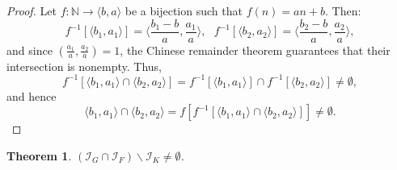 \documentclass{amsart}
\newtheorem{thm}{Theorem}[section]
\theoremstyle{definition}
\newcommand{\N}{{\mathbb N}}
\newcommand{\I}{\mathcal I}
\newcommand{\arithseq}[2]{\langle#2, #1\rangle}
\newcommand{\Arithseq}[2]{\Big\langle#2, #1\Big\rangle}
\begin{document}
\begin{proof}
Let $f\colon\N\to \arithseq{a}{b}$ be a bijection such that $f(n) = an+b$. Then: 
$$f^{-1}[\arithseq{a_1}{b_1}] = \Arithseq{\frac{a_1}{a}}{\frac{b_1-b}{a}},\ \ \ f^{-1}[\arithseq{a_2}{b_2}] = \Arithseq{\frac{a_2}{a}}{\frac{b_2-b}{a}},$$
and since $\left(\frac{a_1}{a},\frac{a_2}{a}\right)=1$, the Chinese remainder theorem guarantees that their intersection is nonempty. Thus,
$$f^{-1}[\arithseq{a_1}{b_1}\cap\arithseq{a_2}{b_2}] = f^{-1}[\arithseq{a_1}{b_1}]\cap f^{-1}[\arithseq{a_2}{b_2}]\neq\emptyset,$$
and hence
$$\arithseq{a_1}{b_1}\cap\arithseq{a_2}{b_2} = f[f^{-1}[\arithseq{a_1}{b_1}\cap\arithseq{a_2}{b_2}]] \neq\emptyset.$$
\end{proof}

\begin{thm}\label{GFnotK}
$(\I_G\cap \I_F) \backslash \I_K \not= \emptyset$.
\end{thm}
\end{document}
